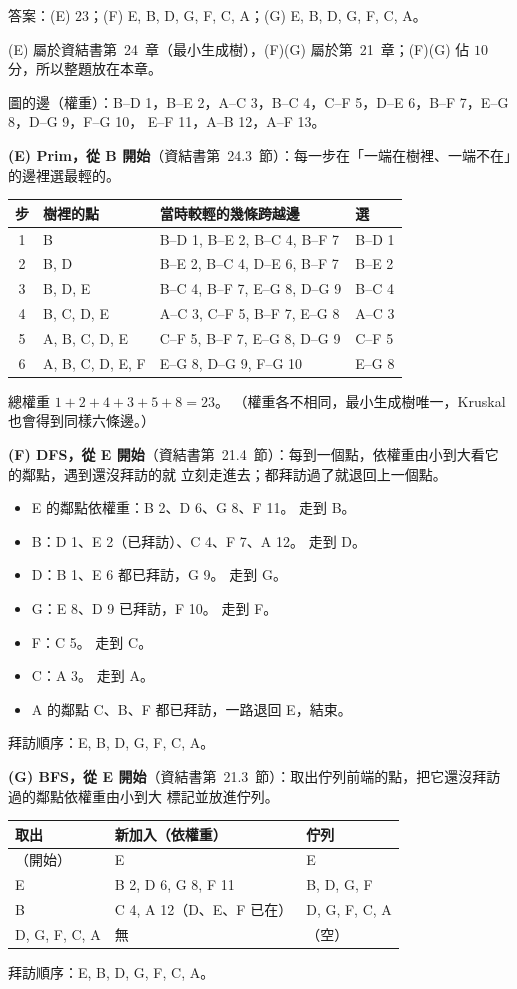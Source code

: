 \begin{pastsoln}
答案：(E) $23$；(F) E, B, D, G, F, C, A；(G) E, B, D, G, F, C, A。

(E) 屬於資結書第~24~章（最小生成樹），(F)(G) 屬於第~21~章；(F)(G) 佔 $10$ 分，所以整題放在本章。

圖的邊（權重）：B--D 1，B--E 2，A--C 3，B--C 4，C--F 5，D--E 6，B--F 7，E--G 8，D--G 9，F--G 10，
E--F 11，A--B 12，A--F 13。

\textbf{(E) Prim，從 B 開始}（資結書第~24.3~節）：每一步在「一端在樹裡、一端不在」的邊裡選最輕的。
\begin{center}
\small
\begin{tabular}{clll}
\toprule
步 & 樹裡的點 & 當時較輕的幾條跨越邊 & 選 \\
\midrule
1 & B & B--D 1, B--E 2, B--C 4, B--F 7 & B--D 1 \\
2 & B, D & B--E 2, B--C 4, D--E 6, B--F 7 & B--E 2 \\
3 & B, D, E & B--C 4, B--F 7, E--G 8, D--G 9 & B--C 4 \\
4 & B, C, D, E & A--C 3, C--F 5, B--F 7, E--G 8 & A--C 3 \\
5 & A, B, C, D, E & C--F 5, B--F 7, E--G 8, D--G 9 & C--F 5 \\
6 & A, B, C, D, E, F & E--G 8, D--G 9, F--G 10 & E--G 8 \\
\bottomrule
\end{tabular}
\end{center}
總權重 $1 + 2 + 4 + 3 + 5 + 8 = 23$。 （權重各不相同，最小生成樹唯一，Kruskal 也會得到同樣六條邊。）

\textbf{(F) DFS，從 E 開始}（資結書第~21.4~節）：每到一個點，依權重由小到大看它的鄰點，遇到還沒拜訪的就
立刻走進去；都拜訪過了就退回上一個點。
\begin{itemize}
\item E 的鄰點依權重：B 2、D 6、G 8、F 11。 走到 B。
\item B：D 1、E 2（已拜訪）、C 4、F 7、A 12。 走到 D。
\item D：B 1、E 6 都已拜訪，G 9。 走到 G。
\item G：E 8、D 9 已拜訪，F 10。 走到 F。
\item F：C 5。 走到 C。
\item C：A 3。 走到 A。
\item A 的鄰點 C、B、F 都已拜訪，一路退回 E，結束。
\end{itemize}
拜訪順序：E, B, D, G, F, C, A。

\textbf{(G) BFS，從 E 開始}（資結書第~21.3~節）：取出佇列前端的點，把它還沒拜訪過的鄰點依權重由小到大
標記並放進佇列。
\begin{center}
\begin{tabular}{lll}
\toprule
取出 & 新加入（依權重） & 佇列 \\
\midrule
（開始） & E & E \\
E & B 2, D 6, G 8, F 11 & B, D, G, F \\
B & C 4, A 12（D、E、F 已在） & D, G, F, C, A \\
D, G, F, C, A & 無 & （空） \\
\bottomrule
\end{tabular}
\end{center}
拜訪順序：E, B, D, G, F, C, A。


\end{pastsoln}
